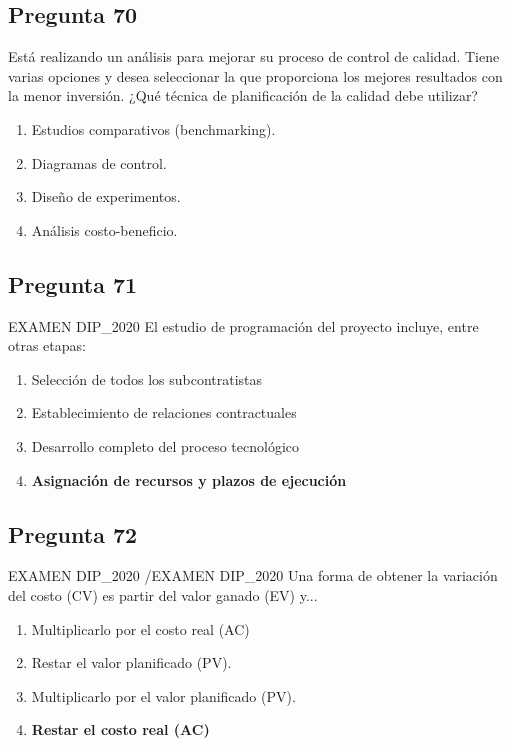 \documentclass[11pt,a4paper]{article}
\begin{document}
\subsection*{Pregunta 70}
Está realizando un análisis para mejorar su proceso de control de calidad. Tiene varias opciones y desea seleccionar la que proporciona los mejores resultados con la menor inversión. ¿Qué técnica de planificación de la calidad debe utilizar?

\begin{enumerate}[label=\alph*)]
  \item Estudios comparativos (benchmarking).
  \item Diagramas de control.
  \item Diseño de experimentos.
  \item Análisis costo-beneficio.
\end{enumerate}

\subsection*{Pregunta 71}
EXAMEN DIP\_2020 El estudio de programación del proyecto incluye, entre otras etapas:

\begin{enumerate}[label=\alph*)]
  \item Selección de todos los subcontratistas
  \item Establecimiento de relaciones contractuales
  \item Desarrollo completo del proceso tecnológico
  \item \textbf{Asignación de recursos y plazos de ejecución}
\end{enumerate}

\subsection*{Pregunta 72}
EXAMEN DIP\_2020 /EXAMEN DIP\_2020 Una forma de obtener la variación del costo (CV) es partir del valor ganado (EV) y...

\begin{enumerate}[label=\alph*)]
  \item Multiplicarlo por el costo real (AC)
  \item Restar el valor planificado (PV).
  \item Multiplicarlo por el valor planificado (PV).
  \item \textbf{Restar el costo real (AC)}
\end{enumerate}
\end{document}
